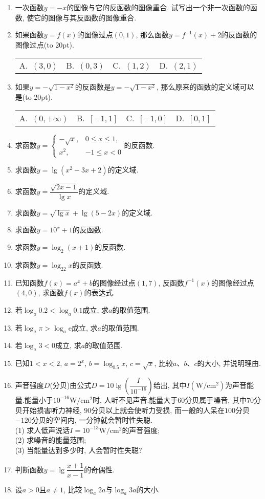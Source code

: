 \documentclass[10pt,a4paper]{article}
\newcommand{\blank}[1]{\underline{\hbox to #1pt{}}}
\newcommand{\bracket}[1]{(\hbox to #1pt{})}
\newcommand{\fourch}[4]{\par\begin{tabular}{p{.23\textwidth}p{.23\textwidth}p{.23\textwidth}p{.23\textwidth}}
A.~#1 &B.~#2& C.~#3& D.~#4
\end{tabular}}
\begin{document}
\begin{enumerate}[1.]
(3) 奇函数必存在反函数.\blank{20}.
\item 一次函数$y=-x$的图像与它的反函数的图像重合. 试写出一个非一次函数的函数, 使它的图像与其反函数的图像重合.
\item 如果函数$y=f(x)$的图像过点$(0, 1)$, 那么函数$y=f^{-1}(x)+2$的反函数的图像过点\bracket{20}.
\fourch{$(3, 0)$}{$(0, 3)$}{$(1, 2)$}{$(2, 1)$}
\item 如果$y=-\sqrt {1-x^2}$的反函数是$y=-\sqrt {1-x^2}$, 那么原来的函数的定义域可以是\bracket{20}.
\fourch{$(0,+\infty)$}{$[-1,1]$}{$[-1,0]$}{$[0,1]$}
\item 求函数$y=\begin{cases} -\sqrt x, & 0\le x\le 1, \\ x^2, & -1\le x<0 \end{cases}$的反函数.
\item 求函数$y=\lg (x^2-3x+2)$的定义域.
\item 求函数$y=\dfrac{\sqrt {2x-1}}{\lg x}$的定义域.
\item 求函数$y=\sqrt {\lg x}+\lg (5-2x)$的定义域.
\item 求函数$y=10^x+1$的反函数.
\item 求函数$y=\log _2(x+1)$的反函数.
\item 求函数$y=\log _22x$的反函数.
\item 已知函数$f(x)=a^x+b$的图像经过点$(1, 7)$, 反函数$f^{-1}(x)$的图像经过点$(4, 0)$, 求函数$f(x)$的表达式.
\item 若$\log _a0.2<\log _a0.1$成立, 求$a$的取值范围.
\item 若$\log _a\pi >\log _a\mathrm{e}$成立, 求$a$的取值范围.
\item 若$\log _a3<0$成立, 求$a$的取值范围.
\item 已知$1<x<2$, $a=2^x$, $b=\log _{0.5}x$, $c=\sqrt x$, 比较$a$、$b$、$c$的大小, 并说明理由.
\item 声音强度$D$(分贝)由公式$D=10\lg (\dfrac I{10^{-16}})$给出, 其中$I(\text{W}/\text{cm}^2)$为声音能量.能量小于$10^{-16}\text{W}/\text{cm}^2$时, 人听不见声音.能量大于$60$分贝属于噪音, 其中$70$分贝开始损害听力神经, $90$分贝以上就会使听力受损, 而一般的人呆在$100$分贝$-120$分贝的空间内, 一分钟就会暂时性失聪.\\
(1) 求人低声说话$I=10^{-13}\text{W}/\text{cm}^2$的声音强度;\\
(2) 求噪音的能量范围;\\
(3) 当能量达到多少时, 人会暂时性失聪?
\item 判断函数$y=\lg\dfrac{x+1}{x-1}$的奇偶性.
\item 设$a>0$且$a\ne 1$, 比较$\log _a2a$与$\log _a3a$的大小.

\end{enumerate}
\end{document}
